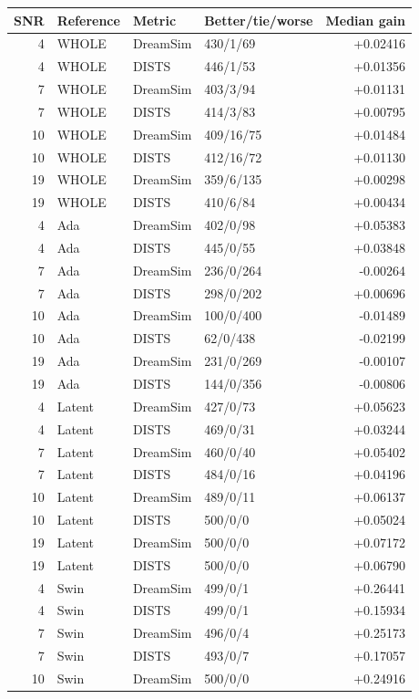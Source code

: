 \documentclass[10pt,letterpaper]{article}
\begin{document}
\begin{longtable}{@{}rlllr@{}}\toprule
SNR & Reference & Metric & Better/tie/worse & Median gain\\\midrule\endhead
4 & WHOLE & DreamSim & 430/1/69 & +0.02416\\
4 & WHOLE & DISTS & 446/1/53 & +0.01356\\
7 & WHOLE & DreamSim & 403/3/94 & +0.01131\\
7 & WHOLE & DISTS & 414/3/83 & +0.00795\\
10 & WHOLE & DreamSim & 409/16/75 & +0.01484\\
10 & WHOLE & DISTS & 412/16/72 & +0.01130\\
19 & WHOLE & DreamSim & 359/6/135 & +0.00298\\
19 & WHOLE & DISTS & 410/6/84 & +0.00434\\
4 & Ada & DreamSim & 402/0/98 & +0.05383\\
4 & Ada & DISTS & 445/0/55 & +0.03848\\
7 & Ada & DreamSim & 236/0/264 & -0.00264\\
7 & Ada & DISTS & 298/0/202 & +0.00696\\
10 & Ada & DreamSim & 100/0/400 & -0.01489\\
10 & Ada & DISTS & 62/0/438 & -0.02199\\
19 & Ada & DreamSim & 231/0/269 & -0.00107\\
19 & Ada & DISTS & 144/0/356 & -0.00806\\
4 & Latent & DreamSim & 427/0/73 & +0.05623\\
4 & Latent & DISTS & 469/0/31 & +0.03244\\
7 & Latent & DreamSim & 460/0/40 & +0.05402\\
7 & Latent & DISTS & 484/0/16 & +0.04196\\
10 & Latent & DreamSim & 489/0/11 & +0.06137\\
10 & Latent & DISTS & 500/0/0 & +0.05024\\
19 & Latent & DreamSim & 500/0/0 & +0.07172\\
19 & Latent & DISTS & 500/0/0 & +0.06790\\
4 & Swin & DreamSim & 499/0/1 & +0.26441\\
4 & Swin & DISTS & 499/0/1 & +0.15934\\
7 & Swin & DreamSim & 496/0/4 & +0.25173\\
7 & Swin & DISTS & 493/0/7 & +0.17057\\
10 & Swin & DreamSim & 500/0/0 & +0.24916\\

\end{longtable}
\end{document}
